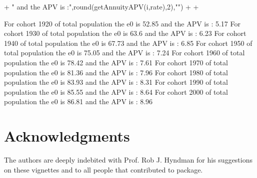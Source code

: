 \documentclass[nojss]{jss}
\begin{document}
\begin{Schunk}
\begin{Sinput}
{+ 		" and the APV is :",round(getAnnuityAPV(i,rate),2),"\n")
+ 		
+ 	}
\end{Sinput}
\begin{Soutput}
For cohort  1920 of total population the e0 is 52.85  and the APV is : 5.17 
For cohort  1930 of total population the e0 is 63.6  and the APV is : 6.23 
For cohort  1940 of total population the e0 is 67.73  and the APV is : 6.85 
For cohort  1950 of total population the e0 is 75.05  and the APV is : 7.24 
For cohort  1960 of total population the e0 is 78.42  and the APV is : 7.61 
For cohort  1970 of total population the e0 is 81.36  and the APV is : 7.96 
For cohort  1980 of total population the e0 is 83.93  and the APV is : 8.31 
For cohort  1990 of total population the e0 is 85.55  and the APV is : 8.64 
For cohort  2000 of total population the e0 is 86.81  and the APV is : 8.96 
\end{Soutput}
\end{Schunk}


\section*{Acknowledgments}\label{sec:acknowledgments}

The authors are deeply indebited with Prof. Rob J. Hyndman for his suggestions on these vignettes and to all people that contributed to  package.



\end{document}
